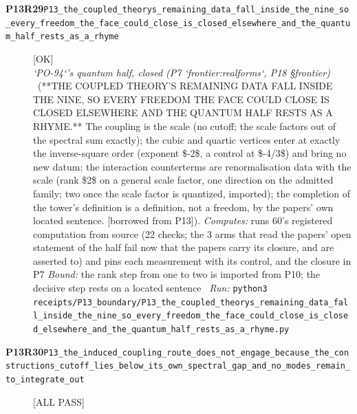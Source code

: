 \begin{description}
\item[\textbf{P13R29}\quad\texttt{P13\_the\_coupled\_theorys\_remaining\_data\_fall\_inside\_the\_nine\_so\_every\_freedom\_the\_face\_could\_close\_is\_closed\_elsewhere\_and\_the\_quantum\_half\_rests\_as\_a\_rhyme}]\hfill\textsf{[OK]}\\
\textit{`PO-94`'s quantum half, closed (P7 `frontier:realforms`, P18 \S{}frontier)} \ (**THE COUPLED THEORY'S REMAINING DATA FALL INSIDE THE NINE, SO EVERY FREEDOM THE FACE COULD CLOSE IS CLOSED ELSEWHERE AND THE QUANTUM HALF RESTS AS A RHYME.** The coupling is the scale (no cutoff; the scale factors out of the spectral sum exactly); the cubic and quartic vertices enter at exactly the inverse-square order (exponent \$-2\$, a control at \$-4/3\$) and bring no new datum; the interaction counterterms are renormalisation data with the scale (rank \$2\$ on a general scale factor, one direction on the admitted family; two once the scale factor is quantized, imported); the completion of the tower's definition is a definition, not a freedom, by the papers' own located sentence. [borrowed from P13]). 
\emph{Computes:} runs 60's registered computation from source (22 checks; the 3 arms that read the papers' open statement of the half fail now that the papers carry its closure, and are asserted to) and pins each measurement with its control, and the closure in P7
 \emph{Bound:} the rank step from one to two is imported from P10; the decisive step rests on a located sentence
\ \emph{Run:} \texttt{python3 receipts/P13\_boundary/P13\_the\_coupled\_theorys\_remaining\_data\_fall\_inside\_the\_nine\_so\_every\_freedom\_the\_face\_could\_close\_is\_closed\_elsewhere\_and\_the\_quantum\_half\_rests\_as\_a\_rhyme.py}
\item[\textbf{P13R30}\quad\texttt{P13\_the\_induced\_coupling\_route\_does\_not\_engage\_because\_the\_constructions\_cutoff\_lies\_below\_its\_own\_spectral\_gap\_and\_no\_modes\_remain\_to\_integrate\_out}]\hfill\textsf{[ALL PASS]}\\

\end{description}
